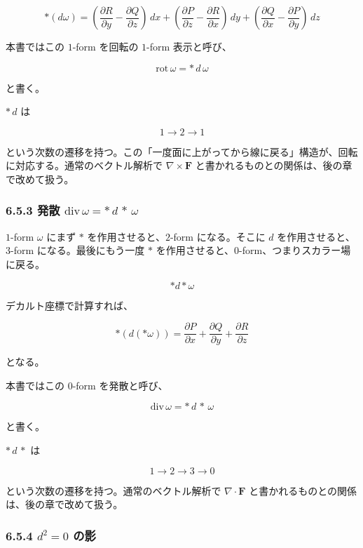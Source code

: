 \documentclass[a4paper,12pt,openany]{book}
\begin{document}
\[\ast(d\omega) = (\frac{\partial R}{\partial y} - \frac{\partial Q}{\partial z})\,dx + (\frac{\partial P}{\partial z} - \frac{\partial R}{\partial x})\,dy + (\frac{\partial Q}{\partial x} - \frac{\partial P}{\partial y})\,dz\]

本書ではこの \(1\)-form を回転の \(1\)-form 表示と呼び、

\[\mathrm{rot}\,\omega = \ast\,d\,\omega\]

と書く。

\(\ast\,d\) は

\[
1 \to 2 \to 1
\]

という次数の遷移を持つ。この「一度面に上がってから線に戻る」構造が、回転に対応する。通常のベクトル解析で
\(\nabla\times\mathbf F\) と書かれるものとの関係は、後の章で改めて扱う。

\hypertarget{ux767aux6563-mathrmdivomega-astdastomega}{%
\subsubsection{\texorpdfstring{6.5.3 発散
\(\mathrm{div}\,\omega = \ast\,d\,\ast\,\omega\)}{6.5.3 発散 \textbackslash mathrm\{div\}\textbackslash,\textbackslash omega = \textbackslash ast\textbackslash,d\textbackslash,\textbackslash ast\textbackslash,\textbackslash omega}}\label{ux767aux6563-mathrmdivomega-astdastomega}}

\(1\)-form \(\omega\) にまず \(\ast\) を作用させると、\(2\)-form
になる。そこに \(d\) を作用させると、\(3\)-form になる。最後にもう一度
\(\ast\) を作用させると、\(0\)-form、つまりスカラー場に戻る。

\[
\ast d\ast\omega
\]

デカルト座標で計算すれば、

\[\ast(d(\ast\omega)) = \frac{\partial P}{\partial x} + \frac{\partial Q}{\partial y} + \frac{\partial R}{\partial z}\]

となる。

本書ではこの \(0\)-form を発散と呼び、

\[\mathrm{div}\,\omega = \ast\,d\,\ast\,\omega\]

と書く。

\(\ast\,d\,\ast\) は

\[
1 \to 2 \to 3 \to 0
\]

という次数の遷移を持つ。通常のベクトル解析で \(\nabla\cdot\mathbf F\)
と書かれるものとの関係は、後の章で改めて扱う。

\hypertarget{d2-0-ux306eux5f71}{%
\subsubsection{\texorpdfstring{6.5.4 \(d^2 = 0\)
の影}{6.5.4 d\^{}2 = 0 の影}}\label{d2-0-ux306eux5f71}}
\end{document}
